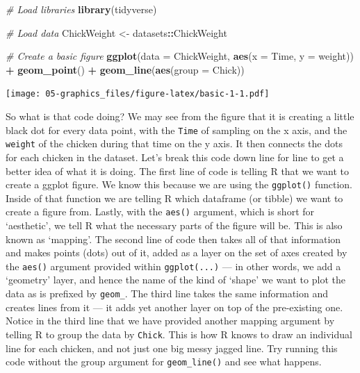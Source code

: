 \documentclass[
]{book}
\newenvironment{Shaded}{\begin{snugshade}}{\end{snugshade}}
\newcommand{\CommentTok}[1]{\textcolor[rgb]{0.56,0.35,0.01}{\textit{#1}}}
\newcommand{\DataTypeTok}[1]{\textcolor[rgb]{0.13,0.29,0.53}{#1}}
\newcommand{\KeywordTok}[1]{\textcolor[rgb]{0.13,0.29,0.53}{\textbf{#1}}}
\newcommand{\NormalTok}[1]{#1}
\newcommand{\OperatorTok}[1]{\textcolor[rgb]{0.81,0.36,0.00}{\textbf{#1}}}
\newcommand{\StringTok}[1]{\textcolor[rgb]{0.31,0.60,0.02}{#1}}
\begin{document}
\begin{Shaded}
\begin{Highlighting}[]
\CommentTok{\# Load libraries}
\KeywordTok{library}\NormalTok{(tidyverse)}

\CommentTok{\# Load data}
\NormalTok{ChickWeight <{-}}\StringTok{ }\NormalTok{datasets}\OperatorTok{::}\NormalTok{ChickWeight}

\CommentTok{\# Create a basic figure}
\KeywordTok{ggplot}\NormalTok{(}\DataTypeTok{data =}\NormalTok{ ChickWeight, }\KeywordTok{aes}\NormalTok{(}\DataTypeTok{x =}\NormalTok{ Time, }\DataTypeTok{y =}\NormalTok{ weight)) }\OperatorTok{+}
\StringTok{  }\KeywordTok{geom\_point}\NormalTok{() }\OperatorTok{+}
\StringTok{  }\KeywordTok{geom\_line}\NormalTok{(}\KeywordTok{aes}\NormalTok{(}\DataTypeTok{group =}\NormalTok{ Chick))}
\end{Highlighting}
\end{Shaded}

\texttt{[image: 05-graphics\_files/figure-latex/basic-1-1.pdf]}

So what is that code doing? We may see from the figure that it is creating a little black dot for every data point, with the \texttt{Time} of sampling on the x axis, and the \texttt{weight} of the chicken during that time on the y axis. It then connects the dots for each chicken in the dataset. Let's break this code down line for line to get a better idea of what it is doing. The first line of code is telling R that we want to create a ggplot figure. We know this because we are using the \texttt{ggplot()} function. Inside of that function we are telling R which dataframe (or tibble) we want to create a figure from. Lastly, with the \texttt{aes()} argument, which is short for `aesthetic', we tell R what the necessary parts of the figure will be. This is also known as `mapping'. The second line of code then takes all of that information and makes points (dots) out of it, added as a layer on the set of axes created by the \texttt{aes()} argument provided within \texttt{ggplot(...)} --- in other words, we add a `geometry' layer, and hence the name of the kind of `shape' we want to plot the data as is prefixed by \texttt{geom\_}. The third line takes the same information and creates lines from it --- it adds yet another layer on top of the pre-existing one. Notice in the third line that we have provided another mapping argument by telling R to group the data by \texttt{Chick}. This is how R knows to draw an individual line for each chicken, and not just one big messy jagged line. Try running this code without the group argument for \texttt{geom\_line()} and see what happens.
\end{document}

